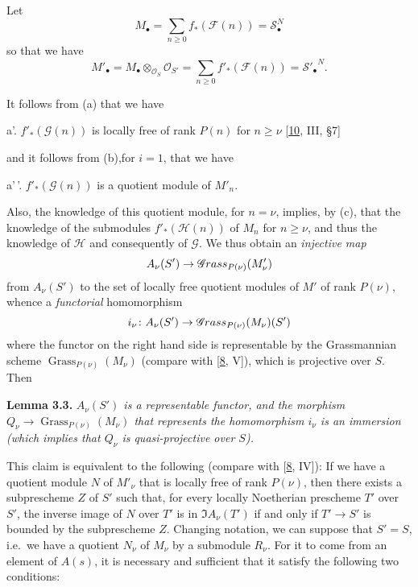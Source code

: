 \documentclass{article}
\newenvironment{itenv}[1]
  {\phantomsection\par\smallskip\noindent\textbf{#1.}\itshape}
  {\par\smallskip}
\newcommand{\oldpage}[1]{\marginpar{\footnotesize$\Big\vert$ \textit{p.~#1}}}
\theoremstyle{definition}
\theoremstyle{definition}
\theoremstyle{definition}
\theoremstyle{definition}
\theoremstyle{remark}
\begin{document}
Let
\[
  M_\bullet
  = \sum_{n\geqslant 0} f_*({\mathscr{F}}(n))
  = {\mathcal{S}}_\bullet^N
\]
so that we have
\[
  M'_\bullet
  = M_\bullet\otimes_{{\mathscr{O}}_S}{\mathscr{O}}_{S'}
  = \sum_{n\geqslant 0} f'_*({\mathscr{F}}(n))
  = {{\mathcal{S}}'_\bullet}^N.
\]

It follows from (a) that we have

a'. \(f'_*({\mathscr{G}}(n))\) is locally free of rank \(P(n)\) for \(n\geqslant\nu\) {[}\protect\hyperlink{ref-GD1960}{10}, III, §7{]}

and it follows from (b),for \(i=1\), that we have

a'\,'. \(f'_*({\mathscr{G}}(n))\) is a quotient module of \(M'_n\).

Also, the knowledge of this quotient module, for \(n=\nu\), implies, by (c), that the knowledge of the submodules \(f'_*({\mathscr{H}}(n))\) of \(M_n\) for \(n\geqslant\nu\), and thus the knowledge of \({\mathscr{H}}\) and consequently of \({\mathscr{G}}\).
We thus obtain an \emph{injective map}
\[
  A_\nu(S') \to \mathscr{G}\kern -.5pt rass_{P(\nu)}(M'_\nu)
\]
from \(A_\nu(S')\) to the set of locally free quotient modules of \(M'\) of rank \(P(\nu)\), whence a \emph{functorial} homomorphism
\[
  i_\nu\colon A_\nu(S') \to \mathscr{G}\kern -.5pt rass_{P(\nu)}(M_\nu)(S')
\]
where the functor on the right hand side is representable by the Grassmannian scheme \(\operatorname{Grass}_{P(\nu)}(M_\nu)\) (compare with {[}\protect\hyperlink{ref-Gro1960a}{8}, V{]}), which is projective over \(S\).
Then

\leavevmode{}%
\begin{itenv}{Lemma 3.3}
\(A_\nu(S')\) is a representable functor, and the morphism \(Q_\nu\to\operatorname{Grass}_{P(\nu)}(M_\nu)\) that represents the homomorphism \(i_\nu\) is an immersion (which implies that \(Q_\nu\) is quasi-projective over \(S\)).

\end{itenv}

This claim is equivalent to the following (compare with {[}\protect\hyperlink{ref-Gro1960a}{8}, IV{]}):
If we have a quotient module \(N\) of \(M'_\nu\) that is locally free of rank \(P(\nu)\), then there exists a subprescheme \(Z\) of \(S'\) such that, for every locally Noetherian prescheme \(T'\) over \(S'\), the inverse image of \(N\) over \(T'\) is in \(\Im A_\nu(T')\) if and only if \(T'\to S'\) is bounded by the subprescheme \(Z\).
\oldpage{221-14}Changing notation, we can suppose that \(S'=S\), i.e.~we have a quotient \(N_\nu\) of \(M_\nu\) by a submodule \(R_\nu\).
For it to come from an element of \(A(s)\), it is necessary and sufficient that it satisfy the following two conditions:
\end{document}
